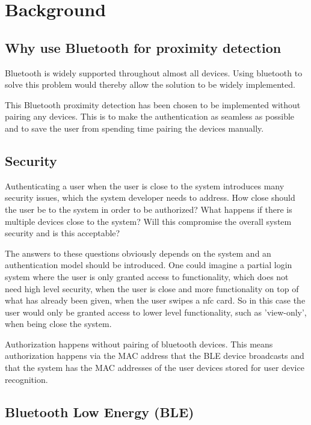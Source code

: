 \section{Background}

\subsection{Why use Bluetooth for proximity detection}

Bluetooth is widely supported throughout almost all devices.
Using bluetooth to solve this problem would thereby allow the solution to be widely implemented.

This Bluetooth proximity detection has been chosen to be implemented without pairing any devices. This is to make the authentication as seamless as possible and to save the user from spending time pairing the devices manually.

\subsection{Security}

Authenticating a user when the user is close to the system introduces many security issues, which the system developer needs to address.
How close should the user be to the system in order to be authorized? What happens if there is multiple devices close to the system? Will this compromise the overall system security and is this acceptable?

The answers to these questions obviously depends on the system and an authentication model should be introduced.
One could imagine a partial login system where the user is only granted access to functionality, which does not need high level security, when the user is close and more functionality on top of what has already been given, when the user swipes a nfc card.
So in this case the user would only be granted access to lower level functionality, such as 'view-only', when being close the system.

Authorization happens without pairing of bluetooth devices.
This means authorization happens via the MAC address that the BLE device broadcasts and that the system has the MAC addresses of the user devices stored for user device recognition.

\subsection{Bluetooth Low Energy (BLE)}

